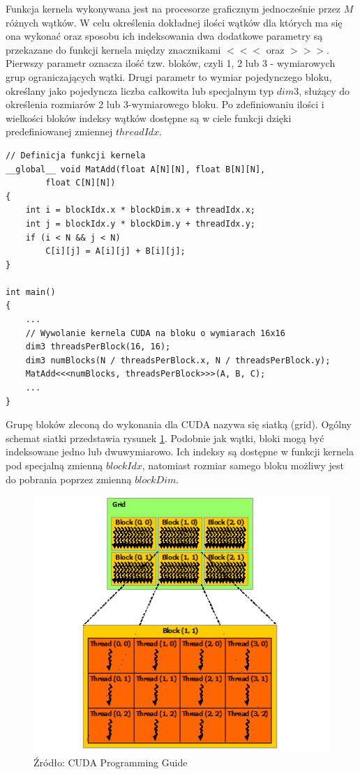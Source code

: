 Funkcja kernela wykonywana jest na procesorze graficznym jednocześnie przez $M$
różnych wątków. W celu określenia dokładnej ilości wątków dla których ma się ona
wykonać oraz sposobu ich indeksowania dwa dodatkowe parametry
są przekazane do funkcji kernela między znacznikami $<<<$ oraz $>>>$. Pierwszy parametr
oznacza ilość tzw. bloków, czyli 1, 2 lub 3 - wymiarowych grup ograniczających
wątki. Drugi parametr to wymiar pojedynczego bloku, określany jako pojedyncza liczba
całkowita lub specjalnym typ $dim3$, służący do określenia rozmiarów 2 lub
3-wymiarowego bloku. Po zdefiniowaniu ilości i wielkości bloków indeksy wątków dostępne
są w ciele funkcji dzięki predefiniowanej zmiennej $threadIdx$.

\begin{lstlisting}[caption=Dodawanie macierzy, label=kernel]
// Definicja funkcji kernela
__global__ void MatAdd(float A[N][N], float B[N][N],
		float C[N][N])
{
	int i = blockIdx.x * blockDim.x + threadIdx.x;
	int j = blockIdx.y * blockDim.y + threadIdx.y;
	if (i < N && j < N)
		C[i][j] = A[i][j] + B[i][j];
}

int main()
{
	...
	// Wywolanie kernela CUDA na bloku o wymiarach 16x16
	dim3 threadsPerBlock(16, 16);
	dim3 numBlocks(N / threadsPerBlock.x, N / threadsPerBlock.y);
	MatAdd<<<numBlocks, threadsPerBlock>>>(A, B, C);
	...
}
\end{lstlisting}

Grupę bloków zleconą do wykonania dla CUDA nazywa się siatką
(grid). Ogólny schemat siatki przedstawia rysunek \ref{grid}. Podobnie jak
wątki, bloki mogą być indeksowane jedno lub dwuwymiarowo. Ich indeksy są dostępne
w funkcji kernela pod specjalną zmienną $blockIdx$, natomiast rozmiar samego
bloku możliwy jest do pobrania poprzez zmienną $blockDim$.

\begin{figure}[ht]
\centering
\includegraphics[scale=0.8]{images/grid-of-thread-blocks.png}
\caption{Źródło: CUDA Programming Guide}
\label{grid}
\end{figure}

